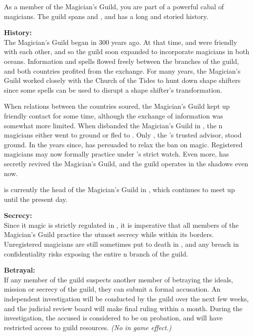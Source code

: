 \documentclass[blue]{NeptuneBall}
\begin{document}
\name{\bMagician{}}

As a member of the Magician's Guild, you are part of a powerful cabal of magicians. The guild spans \pAtlantis{} and \pPacifica{}, and has a long and storied history.

{\bf History:}\\
The Magician's Guild began in \pAtlantis{} 300 years ago. At that time, \pAtlantis{} and \pPacifica{} were friendly with each other, and so the guild soon expanded to incorporate magicians in both oceans. Information and spells flowed freely between the branches of the guild, and both countries profited from the exchange. For many years, the Magician's Guild worked closely with the Church of the Tides to hunt down shape shifters since some spells can be used to disrupt a shape shifter's transformation.

When relations between the countries soured, the Magician's Guild kept up friendly contact for some time, although the exchange of information was somewhat more limited. When \cKing{\King} \cKing{} disbanded the Magician's Guild in \pAtlantis{}, the \pAtlantis{}n magicians either went to ground or fled to \pPacifica{}. Only \cManta{}, the \cKing{\King}'s trusted advisor, stood \cManta{\their} ground. In the years since, \cManta{} has persuaded \cKing{} to relax the ban on magic. Registered magicians may now formally practice under \cManta{}'s strict watch. Even more, \cManta{} has secretly revived the Magician's Guild, and the guild operates in the shadows even now.

\cManta{} is currently the head of the Magician's Guild in \pAtlantis{}, which continues to meet up until the present day.

{\bf Secrecy:}\\
Since it magic is strictly regulated in \pAtlantis{}, it is imperative that all members of the Magician's Guild practice the utmost secrecy while within its borders. Unregistered magicians are still sometimes put to death in \pAtlantis{}, and any breach in confidentiality risks exposing the entire \pAtlantis{}n branch of the guild.

{\bf Betrayal:}\\
If any member of the guild suspects another member of betraying the ideals, mission or secrecy of the guild, they can submit a formal accusation. An independent investigation will be conducted by the guild over the next few weeks, and the judicial review board will make final ruling within a month. During the investigation, the accused is considered to be on probation, and will have restricted access to guild resources. \emph{(No in game effect.)}
\end{document}

